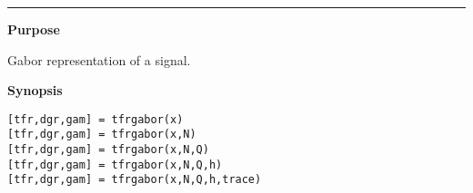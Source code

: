 

\hspace*{-1.6cm}{\Large \bf tfrgabor}

\vspace*{-.4cm}
\hspace*{-1.6cm}\rule[0in]{16.5cm}{.02cm}
\vspace*{.2cm}

{\bf \large {}\selectfont Purpose}\\
\hspace*{1.5cm}
\begin{minipage}[t]{13.5cm}
Gabor representation of a signal.
\end{minipage}
\vspace*{.5cm}

{\bf \large {}\selectfont Synopsis}\\
\hspace*{1.5cm}
\begin{minipage}[t]{13.5cm}
\begin{verbatim}
[tfr,dgr,gam] = tfrgabor(x)
[tfr,dgr,gam] = tfrgabor(x,N)
[tfr,dgr,gam] = tfrgabor(x,N,Q)
[tfr,dgr,gam] = tfrgabor(x,N,Q,h)
[tfr,dgr,gam] = tfrgabor(x,N,Q,h,trace)
\end{verbatim}
\end{minipage}
\vspace*{.5cm}

